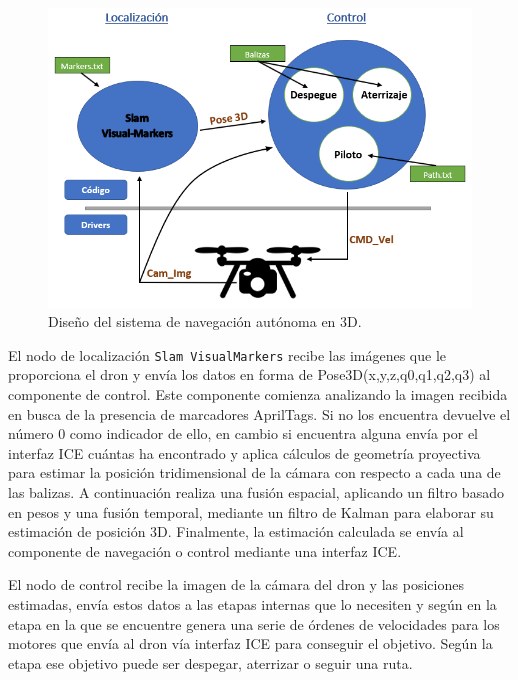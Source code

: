 \begin{figure}[H]
	\begin{center}
		\includegraphics[width=1\textwidth]{imag/IMG80.PNG}
				\caption{Diseño del sistema de navegación autónoma en 3D.}
		\label{fig:Esquema representativo.}	
	\end{center}
\end{figure}

\hspace{1cm} El nodo de localización \texttt{Slam VisualMarkers} recibe las imágenes que le proporciona el dron y envía los datos en forma de Pose3D(x,y,z,q0,q1,q2,q3) al componente de control. Este componente comienza analizando la imagen recibida en busca de la presencia de marcadores AprilTags. Si no los encuentra devuelve el número 0 como indicador de ello, en cambio si encuentra alguna envía por el interfaz ICE cuántas ha encontrado y aplica cálculos de geometría proyectiva para estimar la posición tridimensional de la cámara con respecto a cada una de las balizas. A continuación realiza una fusión espacial, aplicando un filtro basado en pesos y una fusión temporal, mediante un filtro de Kalman para elaborar su estimación de posición 3D. Finalmente, la estimación calculada se envía al componente de navegación o control mediante una interfaz ICE.

\hspace{1cm} El nodo de control recibe la imagen de la cámara del dron y las posiciones estimadas, envía estos datos a las etapas internas que lo necesiten y según en la etapa en la que se encuentre genera una serie de órdenes de velocidades para los motores que envía al dron vía interfaz ICE para conseguir el objetivo. Según la etapa ese objetivo puede ser despegar, aterrizar o seguir una ruta.

